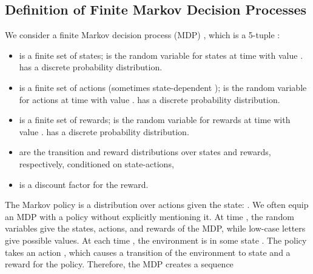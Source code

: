 \documentclass{article}
\begin{document}
\begin{appendices}



\newlength{\auxparskip}
\setlength{\auxparskip}{\parskip} 
\setlength{\parskip}{0pt}
\tableofcontents

\newpage 



\renewcommand{\thesection}{A\arabic{section}}
\renewcommand{\thefigure}{A\arabic{figure}}
\renewcommand{\thetable}{A\arabic{table}}
\renewcommand{\theequation}{A\arabic{equation}}

\setcounter{figure}{0}
\setcounter{table}{0}
\setcounter{equation}{0}

\setcounter{theorem}{0}
\setcounter{definition}{0}
\setcounter{corollary}{0}
\setcounter{proposition}{0}
\setcounter{lemma}{0}

\maketitle
\section{Definition of Finite Markov Decision Processes}
\label{sec:AMDP}

We consider a finite Markov decision process (MDP) ,
which is a 5-tuple :
\begin{itemize}
\item  is a finite set of states;
   is the random variable
  for states at time  with value
  .  has a discrete probability distribution.
\item      is a finite set of actions (sometimes state-dependent
  );   is the random variable
  for actions at time  with value
  .  has a discrete probability distribution.
\item   is a finite set of rewards;  is the random variable
  for rewards at time  with value
  .  has a discrete probability distribution.
\item  are the
  transition and reward distributions over states and rewards, respectively, conditioned on
  state-actions,
\item   is a discount factor for the reward.
\end{itemize}
The Markov policy  is a distribution over
actions given the state: .
We often equip an MDP  with a policy  
without explicitly mentioning it. 
At time , the random variables give the states, actions, and
rewards of the MDP, while low-case letters give possible values.
At each time , the environment is in some state . The policy
 takes an action , which causes a transition of
the environment to state  and a reward  for the
policy.
Therefore, the MDP creates a sequence


\end{appendices}
\end{document}
